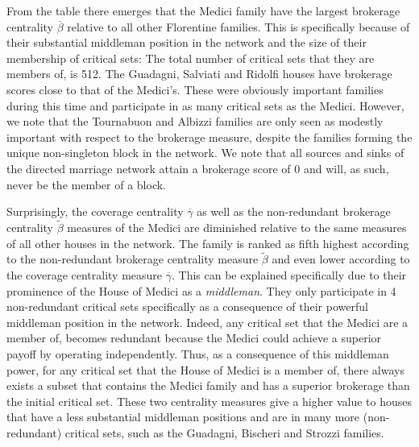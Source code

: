 From the table there emerges that the Medici family have the largest brokerage centrality $\overline{\beta}$ relative to all other Florentine families. This is specifically because of their substantial middleman position in the network and the size of their membership of critical sets: The total number of critical sets that they are members of, is 512. The Guadagni, Salviati and Ridolfi houses have brokerage scores close to that of the Medici's. These were obviously important families during this time and participate in as many critical sets as the Medici. However, we note that the Tournabuon and Albizzi families are only seen as modestly important with respect to the brokerage measure, despite the families forming the unique non-singleton block in the network. We note that all sources and sinks of the directed marriage network attain a brokerage score of 0 and will, as such, never be the member of a block.

Surprisingly, the coverage centrality $\overline{\gamma}$ as well as the non-redundant brokerage centrality $\widetilde{\beta}$ measures of the Medici are diminished relative to the same measures of all other houses in the network. The family is ranked as fifth highest according to the non-redundant brokerage centrality measure $\widetilde{\beta}$ and even lower according to the coverage centrality measure $\overline{\gamma}$. This can be explained specifically due to their prominence of the House of Medici as a \emph{middleman}. They only participate in 4 non-redundant critical sets specifically as a consequence of their powerful middleman position in the network. Indeed, any critical set that the Medici are a member of, becomes redundant because the Medici could achieve a superior payoff by operating independently. Thus, as a consequence of this middleman power, for any critical set that the House of Medici is a member of, there always exists a subset that contains the Medici family and has a superior brokerage than the initial critical set. These two centrality measures give a higher value to houses that have a less substantial middleman positions and are in many more (non-redundant) critical sets, such as the Guadagni, Bischeri and Strozzi families.

